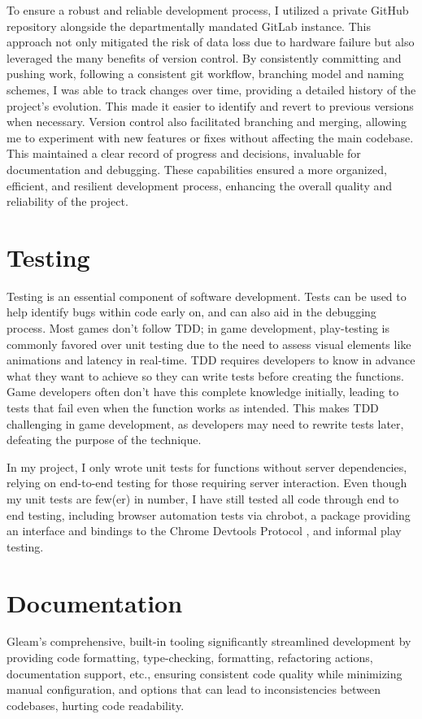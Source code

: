 \documentclass[]{final}
\begin{document}
To ensure a robust and reliable development process, I utilized a private GitHub repository
alongside the departmentally mandated GitLab instance. This approach not only mitigated
the risk of data loss due to hardware failure but also leveraged the many benefits of
version control. By consistently committing and pushing work, following a consistent
git workflow, branching model and naming schemes, I was able to track changes
over time, providing a detailed history of the project's evolution. This made
it easier to identify and revert to previous versions when necessary. Version
control also facilitated branching and merging, allowing me to experiment with
new features or fixes without affecting the main codebase. This maintained a
clear record of progress and decisions, invaluable for documentation and debugging.
These capabilities ensured a more organized, efficient, and resilient development
process, enhancing the overall quality and reliability of the project.

\section{Testing}
Testing is an essential component of software development. Tests can be used to
help identify bugs within code early on, and can also aid in the debugging process.
Most games don't follow TDD; in game development, play-testing is commonly favored
over unit testing due to the need to assess visual elements like animations and
latency in real-time.\cite{politowski_survey_2021} TDD requires developers to know
in advance what they want to
achieve so they can write tests before creating the functions. Game developers often don't
have this complete knowledge initially, leading to tests that fail even when the function
works as intended. This makes TDD challenging in game development, as developers may
need to rewrite tests later, defeating the purpose of the technique.

In my project, I only wrote unit tests for functions without server
dependencies, relying on end-to-end testing for those requiring server interaction.
Even though my unit tests are few(er) in number, I have still tested all code through
end to end testing, including browser automation tests via chrobot, a package providing
an interface and bindings to the Chrome Devtools Protocol \cite{noauthor_chrobot_nodate},
and informal play testing.

\section{Documentation}
Gleam's comprehensive, built-in tooling significantly streamlined development by
providing code formatting, type-checking, formatting, refactoring actions, documentation support, etc.,
ensuring consistent code quality while minimizing manual configuration, and
options that can lead to inconsistencies between codebases, hurting code
readability.
\end{document}
